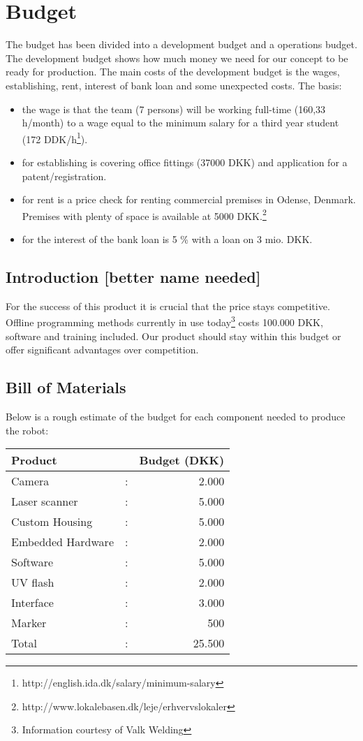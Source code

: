 \section{Budget}
\label{budget_label}
The budget has been divided into a development budget and a operations budget. The development budget shows how much money we need for our concept to be ready for production. The main costs of the development budget is the wages, establishing, rent, interest of bank loan and some unexpected costs. 
The basis: 
\begin{itemize}
\item the wage is that the team (7 persons) will be working full-time (160,33 h/month) to a wage equal to the minimum salary for a third year student (172 DDK/h\footnote{http://english.ida.dk/salary/minimum-salary}).
\item for establishing is covering office fittings (37000 DKK) and application for a patent/registration.
\item for rent is a price check for renting commercial premises in Odense, Denmark. Premises with plenty of space is available at 5000 DKK.\footnote{http://www.lokalebasen.dk/leje/erhvervslokaler}
\item for the interest of the bank loan is 5 \% with a loan on 3 mio. DKK. 
\end{itemize} 


\subsection{Introduction [better name needed]}
For the success of this product it is crucial that the price stays competitive. Offline programming methods currently in use today\footnote{Information courtesy of Valk Welding} costs 100.000 DKK, software and training included. Our product should stay within this budget or offer significant advantages over competition.
\subsection{Bill of Materials}
Below is a rough estimate of the budget for each component needed to produce the robot:
\begin{center}
\begin{tabular}{l c r}
Product           &   & Budget (DKK)\\
\hline
Camera            & : & 2.000  \\
Laser scanner     & : & 5.000 \\
Custom Housing    & : & 5.000\\
Embedded Hardware & : & 2.000\\
Software          & : & 5.000\\
UV flash          & : & 2.000\\
Interface         & : & 3.000\\
Marker            & : & 500\\[0.2cm]
\hline
Total             & : & 25.500\\ 
\end{tabular}
\end{center}

%
